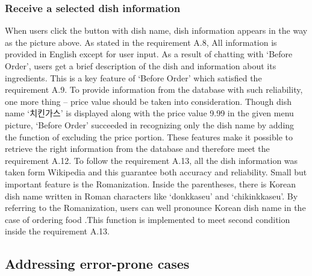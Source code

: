 \subsubsection{Receive a selected dish information}
When users click the button with dish name, dish information appears in the way as the picture above. As stated in the requirement A.8, All information is provided in English except for user input. As a result of chatting with ‘Before Order’, users get a brief description of the dish and information about its ingredients. This is a key feature of ‘Before Order’ which satisfied the requirement A.9. To provide information from the database with such reliability, one more thing – price value should be taken into consideration. Though dish name ‘치킨가스’ is displayed along with the price value 9.99 in the given menu picture, ‘Before Order’ succeeded in recognizing only the dish name by adding the function of excluding the price portion. These features make it possible to retrieve the right information from the database and therefore meet the requirement A.12. To follow the requirement A.13, all the dish information was taken form Wikipedia and this guarantee both accuracy and reliability. Small but important feature is the Romanization. Inside the parentheses, there is Korean dish name written in Roman characters like ‘donkkaseu’ and ‘chikinkkaseu’. By referring to the Romanization, users can well pronounce Korean dish name in the case of ordering food .This function is implemented to meet second condition inside the requirement A.13.


\subsection{Addressing error-prone cases}

